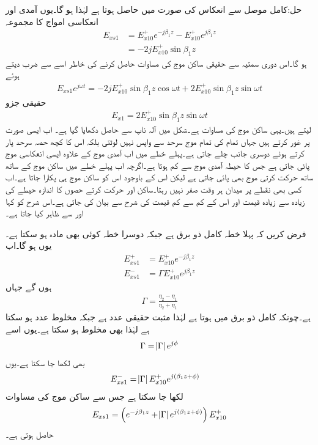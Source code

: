 حل:کامل موصل سے انعکاس کی صورت میں  حاصل ہوتا ہے  لہٰذا  ہو گا۔یوں آمدی اور انعکاسی امواج کا مجموعہ
\begin{align*}
E_{xs1}&=E_{x10}^+ e^{-j \beta_1 z} -E_{x10}^+ e^{j \beta_1 z}\\
&=-2 j E_{x10}^+ \sin \beta_1 z
\end{align*}
ہو گا۔اس دوری سمتیہ سے حقیقی ساکن موج کی مساوات حاصل کرنے کی خاطر اسے  سے ضرب دیتے ہوئے
\begin{align*}
E_{xs1} e^{j\omega t}=-2 j E_{x10}^+ \sin \beta_1 z \cos \omega t +2 E_{x10}^+ \sin \beta_1 z \sin \omega t
\end{align*}
 حقیقی جزو
\begin{align*}
E_{x1}=2 E_{x10}^+ \sin \beta_1 z \sin \omega t
\end{align*}
 لیتے ہیں۔یہی ساکن موج کی مساوات ہے۔شکل  میں آلہ ناپ سے حاصل  دکھایا گیا ہے۔
اب ایسی صورت پر غور کرتے ہیں جہاں تمام کی تمام موج سرحد سے واپس نہیں لوٹتی بلکہ اس کا کچھ حصہ سرحد پار کرتے ہوئے دوسری جانب چلے جاتی ہے۔پہلے خطے میں اب آمدی موج کے علاوہ ایسی انعکاسی موج پائی جاتی ہے جس کا حیطہ آمدی موج سے کم ہوتا ہے۔اگرچہ اب پہلے خطے میں ساکن موج کے ساتھ ساتھ حرکت  کرتی موج بھی پائی جاتی ہے لیکن اس کے باوجود اس کو ساکن موج ہی پکارا جاتا ہے۔اب کسی بھی نقطے پر میدان ہر وقت صفر نہیں رہتا۔ساکن اور حرکت کرتے حصوں کا اندازہ حیطے کی زیادہ سے زیادہ قیمت اور اس کے کم سے کم قیمت کی شرح سے بیان کی جاتی ہے۔اس شرح کو  کہا اور  سے ظاہر کیا جاتا ہے۔ 

فرض کریں کہ پہلا خطہ کامل ذو برق ہے جبکہ دوسرا خطہ کوئی بھی مادہ ہو سکتا ہے۔یوں  ہو گا۔اب
\begin{align*}
E_{xs1}^+&=E_{x10}^+ e^{-j\beta_1 z}\\
E_{xs1}^-&=\Gamma E_{x10}^+ e^{j\beta_1 z}
\end{align*}
ہوں گے جہاں
\begin{align*}
\Gamma=\frac{\eta_2-\eta_1}{\eta_2+\eta_1}
\end{align*}
ہے۔چونکہ کامل ذو برق میں  ہوتا ہے لہٰذا  مثبت حقیقی عدد ہے جبکہ  مخلوط عدد ہو سکتا ہے لہٰذا  بھی مخلوط ہو سکتا ہے۔یوں اسے
\begin{align*}
\Gamma=\abs{\Gamma}e^{j \phi}
\end{align*}
بھی لکھا جا سکتا ہے۔یوں
\begin{align*}
E_{xs1}^-&=\abs{\Gamma} E_{x10}^+ e^{j(\beta_1 z+\phi)}
\end{align*}
لکھا جا سکتا ہے جس سے ساکن موج کی مساوات
\begin{align}\label{مساوات_موج_ساکن_مخلوط_موج}
E_{xs1}=\left(e^{-j\beta_1 z}+\abs{\Gamma} e^{j(\beta_1z +\phi)} \right) E_{x10}^+
\end{align}
حاصل ہوتی ہے۔


